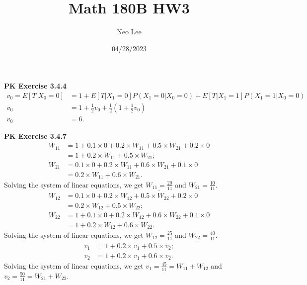 \documentclass{article}
\title{Math 180B HW3}
\author{Neo Lee}
\date{04/28/2023}
\begin{document}
 

\maketitle 

\textbf{PK Exercise 3.4.4}
\begin{align}
    v_0 = E[T|X_0=0] & = 1 + E[T|X_1=0]P(X_1=0|X_0=0) + E[T|X_1=1]P(X_1=1|X_0=0) \nonumber \\
    v_0 & = 1 + \frac{1}{2}v_0 + \frac{1}{2}(1 + \frac{1}{2}v_0) \nonumber \\
    v_0 & = 6. \nonumber 
\end{align}
\bigbreak


\textbf{PK Exercise 3.4.7}
\begin{align}
    W_{11} & = 1 + 0.1\times 0 + 0.2\times W_{11} + 0.5\times W_{21} + 0.2\times 0 \nonumber \\
    & = 1 + 0.2\times W_{11} + 0.5\times W_{21}; \nonumber \\
    W_{21} & = 0.1\times 0 + 0.2\times W_{11} + 0.6\times W_{21} + 0.1\times 0 \nonumber \\
    & = 0.2\times W_{11} + 0.6\times W_{21}. \nonumber 
\end{align}
Solving the system of linear equations, we get $\underline{W_{11} = \frac{20}{11}}$ and $W_{21} = \frac{10}{11}$. \bigbreak
\begin{align}
    W_{12} & = 0.1\times 0 + 0.2\times W_{12} + 0.5\times W_{22} + 0.2\times 0 \nonumber \\
    & = 0.2\times W_{12} + 0.5\times W_{22}; \nonumber \\
    W_{22} & = 1 + 0.1\times 0 + 0.2\times W_{12} + 0.6\times W_{22} + 0.1\times 0 \nonumber \\
    & = 1 + 0.2\times W_{12} + 0.6\times W_{22}. \nonumber 
\end{align}
Solving the system of linear equations, we get $\underline{W_{12} = \frac{25}{11}}$ and $W_{22} = \frac{40}{11}$. \bigbreak
\begin{align}
    v_1 & = 1 + 0.2\times v_1 + 0.5\times v_2; \nonumber \\
    v_2 & = 1 + 0.2\times v_1 + 0.6\times v_2. \nonumber
\end{align}
Solving the system of linear equations, we get $v_1 = \frac{45}{11} = W_{11} + W_{12}$ and $v_2 = \frac{50}{11} = W_{21} + W_{22}$. \bigbreak
\bigbreak
\end{document}
